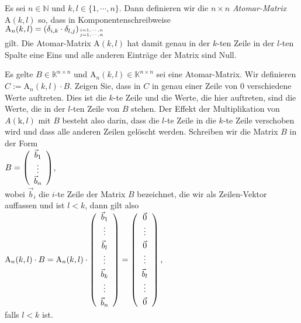 \begin{Definition}
  Es sei $n\in\mathbb{N}$ und $k,l \in \{1,\cdots,n\}$.  Dann 
  definieren wir die $n \times n$ {\emph{\color{blue}Atomar-Matrix}} $\mathrm{A}(k,l)$ so, dass in Komponentenschreibweise
  \\[0.2cm]
  \hspace*{1.3cm}
  $\mathrm{A}_n(k,l) = (\delta_{i,k} \cdot \delta_{l,j})_{{i = 1, \cdots, n} \atop {j = 1, \cdots, n}}$
  \\[0.2cm]
  gilt.  Die Atomar-Matrix $\mathrm{A}(k,l)$ hat damit genau in der $k$-ten Zeile in der $l$-ten Spalte eine
  Eins und alle anderen Eintr\"{a}ge der Matrix sind Null.  \eoxs
\end{Definition}

\exercise
Es gelte $B \in \mathbb{K}^{n \times n}$ und $\mathrm{A}_n(k,l) \in \mathbb{K}^{n \times n}$ sei eine Atomar-Matrix.  
Wir definieren $C := \mathrm{A}_n(k,l) \cdot B$.  Zeigen Sie, dass in $C$ in genau einer Zeile von $0$ verschiedene
Werte auftreten.  Dies ist die $k$-te Zeile und die Werte, die hier auftreten, sind die Werte, die in
der $l$-ten Zeile von $B$ stehen.   Der Effekt der Multiplikation von $A(\mathrm{k},l)$ mit $B$ besteht also darin,
dass die $l$-te Zeile in die $k$-te Zeile verschoben wird und dass alle anderen Zeilen gel\"{o}scht
werden.  Schreiben wir die Matrix $B$ in der Form
\\[0.2cm]
\hspace*{1.3cm}
$B = \left(
  \begin{array}[c]{c}
    \vec{b}_1 \\
    \vdots       \\
    \vec{b}_n 
  \end{array} 
\right)
$, 
\\[0.2cm]
wobei $\vec{b}_i$ die $i$-te Zeile der Matrix $B$ bezeichnet, die wir als Zeilen-Vektor auffassen und
ist $l < k$, dann gilt also
\\[0.2cm]
\hspace*{1.3cm}
$\mathrm{A}_n(k,l) \cdot B = \mathrm{A}_n(k,l) \cdot \left(
  \begin{array}[c]{c}
    \vec{b}_1 \\
    \vdots       \\[0.1cm]
    \vec{b}_l \\
    \vdots       \\[0.1cm]
    \vec{b}_k \\
    \vdots       \\[0.1cm]
    \vec{b}_n 
  \end{array}
\right) = \left(
  \begin{array}[c]{c}
    \vec{0} \\
    \vdots       \\[0.1cm]
    \vec{0}   \\
    \vdots       \\[0.1cm]
    \vec{b}_l \\
    \vdots       \\[0.1cm]
    \vec{0} 
  \end{array}
\right),
$
\\[0.2cm]
falls $l < k$ ist.
\eox

